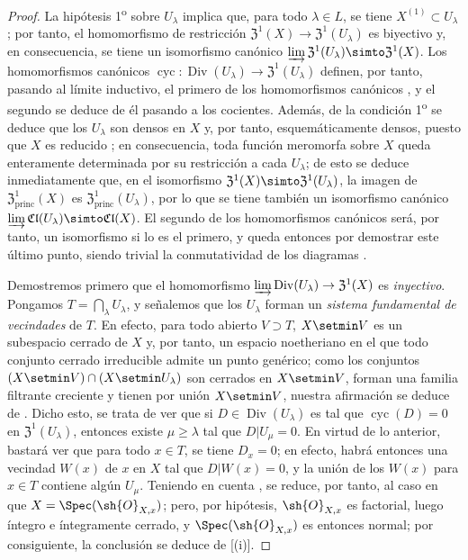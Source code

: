 \begin{proof}
La hipótesis 1\textsuperscript{o} sobre $U_\lambda$ implica que, para todo $\lambda\in L$, se tiene $X^{(1)}\subset U_\lambda$ ; por tanto, el homomorfismo de restricción $\mathfrak{Z}^1(X)\to\mathfrak{Z}^1(U_\lambda)$ es biyectivo y, en consecuencia, se tiene un isomorfismo canónico $\varinjlim\mathfrak{Z}^1(U_\lambda)\simto\mathfrak{Z}^1(X)$.
Los homomorfismos canónicos $\operatorname{cyc}:\operatorname{Div}(U_\lambda)\to\mathfrak{Z}^1(U_\lambda)$ definen, por tanto, pasando al límite inductivo, el primero de los homomorfismos canónicos , y el segundo se deduce de él pasando a los cocientes.
Además, de la condición 1\textsuperscript{o} se deduce que los $U_\lambda$ son densos en $X$ y, por tanto, esquemáticamente densos, puesto que $X$ es reducido ; en consecuencia, toda función meromorfa sobre $X$ queda enteramente determinada por su restricción a cada $U_\lambda$;
de esto se deduce inmediatamente que, en el isomorfismo $\mathfrak{Z}^1(X)\simto\mathfrak{Z}^1(U_\lambda)$, la imagen de $\mathfrak{Z}^1_\mathrm{princ}(X)$ es $\mathfrak{Z}^1_\mathrm{princ}(U_\lambda)$, por lo que se tiene también un isomorfismo canónico $\varinjlim\mathfrak{Cl}(U_\lambda)\simto\mathfrak{Cl}(X)$.
El segundo de los homomorfismos canónicos  será, por tanto, un isomorfismo si lo es el primero, y queda entonces por demostrar este último punto, siendo trivial la conmutatividad de los diagramas .


Demostremos primero que el homomorfismo $\varinjlim\operatorname{Div}(U_\lambda)\to\mathfrak{Z}^1(X)$ es \emph{inyectivo}.
Pongamos $T=\bigcap_\lambda U_\lambda$, y señalemos que los $U_\lambda$ forman un \emph{sistema fundamental de vecindades} de $T$.
En efecto, para todo abierto $V\supset T$, $X\setmin V$ es un subespacio cerrado de $X$ y, por tanto, un espacio noetheriano en el que todo conjunto cerrado irreducible admite un punto genérico;
como los conjuntos $(X\setmin V)\cap(X\setmin U_\lambda)$ son cerrados en $X\setmin V$, forman una familia filtrante creciente y tienen por unión $X\setmin V$, nuestra afirmación se deduce de .
Dicho esto, se trata de ver que si $D\in\operatorname{Div}(U_\lambda)$ es tal que $\operatorname{cyc}(D)=0$ en $\mathfrak{Z}^1(U_\lambda)$, entonces existe $\mu\geq\lambda$ tal que $D|U_\mu=0$.
En virtud de lo anterior, bastará ver que para todo $x\in T$, se tiene $D_x=0$;
en efecto, habrá entonces una vecindad $W(x)$ de $x$ en $X$ tal que $D|W(x)=0$, y la unión de los $W(x)$ para $x\in T$ contiene algún $U_\mu$.
Teniendo en cuenta , se reduce, por tanto, al caso en que $X=\Spec(\sh{O}_{X,x})$;
pero, por hipótesis, $\sh{O}_{X,x}$ es factorial, luego íntegro e íntegramente cerrado, y $\Spec(\sh{O}_{X,x})$ es entonces normal;
por consiguiente, la conclusión se deduce de [(i)].



\end{proof}
